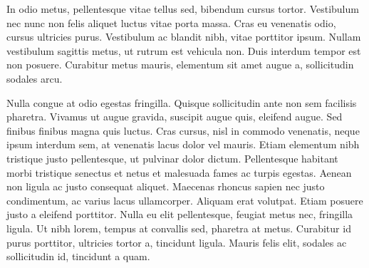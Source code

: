\label{sec-conclusion}
In odio metus, pellentesque vitae tellus sed, bibendum cursus tortor. Vestibulum nec nunc non felis aliquet luctus vitae porta massa. Cras eu venenatis odio, cursus ultricies purus. Vestibulum ac blandit nibh, vitae porttitor ipsum. Nullam vestibulum sagittis metus, ut rutrum est vehicula non. Duis interdum tempor est non posuere. Curabitur metus mauris, elementum sit amet augue a, sollicitudin sodales arcu.

Nulla congue at odio egestas fringilla. Quisque sollicitudin ante non sem facilisis pharetra. Vivamus ut augue gravida, suscipit augue quis, eleifend augue. Sed finibus finibus magna quis luctus. Cras cursus, nisl in commodo venenatis, neque ipsum interdum sem, at venenatis lacus dolor vel mauris. Etiam elementum nibh tristique justo pellentesque, ut pulvinar dolor dictum. Pellentesque habitant morbi tristique senectus et netus et malesuada fames ac turpis egestas. Aenean non ligula ac justo consequat aliquet. Maecenas rhoncus sapien nec justo condimentum, ac varius lacus ullamcorper. Aliquam erat volutpat. Etiam posuere justo a eleifend porttitor. Nulla eu elit pellentesque, feugiat metus nec, fringilla ligula. Ut nibh lorem, tempus at convallis sed, pharetra at metus. Curabitur id purus porttitor, ultricies tortor a, tincidunt ligula. Mauris felis elit, sodales ac sollicitudin id, tincidunt a quam.
